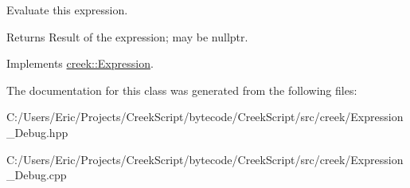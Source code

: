 Evaluate this expression. 

\begin{DoxyReturn}{Returns}
Result of the expression; may be {\ttfamily nullptr}. 
\end{DoxyReturn}


Implements \hyperlink{classcreek_1_1_expression_a3c7fe4a04e24c8d907f918240e2bf43d}{creek\+::\+Expression}.



The documentation for this class was generated from the following files\+:\begin{DoxyCompactItemize}
\item 
C\+:/\+Users/\+Eric/\+Projects/\+Creek\+Script/bytecode/\+Creek\+Script/src/creek/Expression\+\_\+\+Debug.\+hpp\item 
C\+:/\+Users/\+Eric/\+Projects/\+Creek\+Script/bytecode/\+Creek\+Script/src/creek/Expression\+\_\+\+Debug.\+cpp\end{DoxyCompactItemize}
